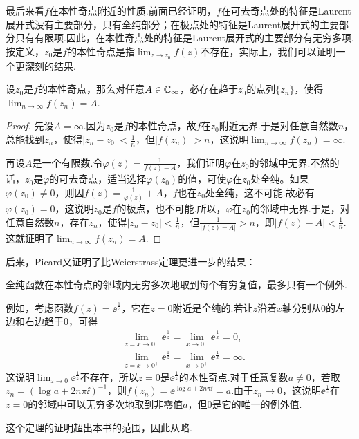 最后来看$f$在本性奇点附近的性质.前面已经证明，$f$在可去奇点处的特征是Laurent展开式没有主要部分，只有全纯部分；在极点处的特征是Laurent展开式的主要部分只有有限项.因此，在本性奇点处的特征是Laurent展开式的主要部分有无穷多项.按定义，$z_0$是$f$的本性奇点是指$\lim_{z\to z_0}f(z)$不存在，实际上，我们可以证明一个更深刻的结果.
\begin{theorem}\label{thm5.2.5}
  设$z_0$是$f$的本性奇点，那么对任意$A\in\mathbb C_\infty$，必存在趋于$z_0$的点列$\{z_n\}$，使得$\lim_{n\to\infty}f(z_n)=A$.
\end{theorem}
\begin{proof}
  先设$A=\infty$.因为$z_0$是$f$的本性奇点，故$f$在$z_0$附近无界.于是对任意自然数$n$，总能找到$z_n$，使得$|z_n-z_0|<\frac1n$，但$|f(z_n)|>n$，这说明$\lim_{n\to\infty}f(z_n)=\infty$.

  再设$A$是一个有限数.令$\varphi(z)=\frac1{f(z)-A}$，我们证明$\varphi$在$z_0$的邻域中无界.不然的话，$z_0$是$\varphi$的可去奇点，适当选择$\varphi(z_0)$的值，可使$\varphi$在$z_0$处全纯。如果$\varphi(z_0)\ne0$，则因$f(z)=\frac1{\varphi(z)}+A$，$f$也在$z_0$处全纯，这不可能.故必有$\varphi(z_0)=0$，这说明$z_0$是$f$的极点，也不可能.所以，$\varphi$在$z_0$的邻域中无界.于是，对任意自然数$n$，存在$z_n$，使得$|z_n-z_0|<\frac1n$，但$\frac1{|f(z)-A|}>n$，即$|f(z)-A|<\frac1n$.这就证明了$\lim_{n\to\infty}f(z_n)=A$.
\end{proof}

后来，Picard又证明了比Weierstrass定理更进一步的结果：
\begin{theorem}\label{thm5.2.6}
  全纯函数在本性奇点的邻域内无穷多次地取到每个有穷复值，最多只有一个例外.
\end{theorem}

例如，考虑函数$f(z)=\ee^{\frac1z}$，它在$z=0$附近是全纯的.若让$z$沿着$x$轴分别从$0$的左边和右边趋于$0$，可得
\begin{align*}
  & \lim_{z=x\to0^-}\ee^{\frac1z} = \lim_{x\to0^-}\ee^{\frac1x} = 0,\\
  & \lim_{z=x\to0^+}\ee^{\frac1z} = \lim_{x\to0^+}\ee^{\frac1x} = \infty.
\end{align*}
这说明$\lim_{z\to0}\ee^{\frac1z}$不存在，所以$z=0$是$\ee^{\frac1z}$的本性奇点.对于任意复数$a\ne0$，若取$z_n=(\log a+2n\pi\ii)^{-1}$，则$f(z_n)=\ee^{\log a+2n\pi\ii}=a$.由于$z_n\to0$，这说明$\ee^{\frac1z}$在$z=0$的邻域中可以无穷多次地取到非零值$a$，但$0$是它的唯一的例外值.

这个定理的证明超出本书的范围，因此从略.

